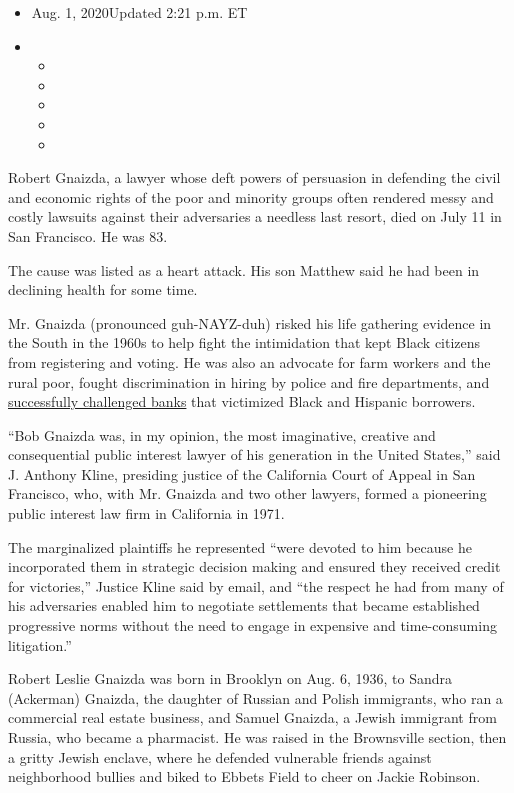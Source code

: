 \begin{itemize}
\item
  Aug. 1, 2020Updated 2:21 p.m. ET
\item
  \begin{itemize}
  \item
  \item
  \item
  \item
  \item
  \end{itemize}
\end{itemize}

Robert Gnaizda, a lawyer whose deft powers of persuasion in defending
the civil and economic rights of the poor and minority groups often
rendered messy and costly lawsuits against their adversaries a needless
last resort, died on July 11 in San Francisco. He was 83.

The cause was listed as a heart attack. His son Matthew said he had been
in declining health for some time.

Mr. Gnaizda (pronounced guh-NAYZ-duh) risked his life gathering evidence
in the South in the 1960s to help fight the intimidation that kept Black
citizens from registering and voting. He was also an advocate for farm
workers and the rural poor, fought discrimination in hiring by police
and fire departments, and
\href{https://www.nytimes3xbfgragh.onion/2011/04/14/business/14prosecute.html}{successfully
challenged banks} that victimized Black and Hispanic borrowers.

``Bob Gnaizda was, in my opinion, the most imaginative, creative and
consequential public interest lawyer of his generation in the United
States,'' said J. Anthony Kline, presiding justice of the California
Court of Appeal in San Francisco, who, with Mr. Gnaizda and two other
lawyers, formed a pioneering public interest law firm in California in
1971.

The marginalized plaintiffs he represented ``were devoted to him because
he incorporated them in strategic decision making and ensured they
received credit for victories,'' Justice Kline said by email, and ``the
respect he had from many of his adversaries enabled him to negotiate
settlements that became established progressive norms without the need
to engage in expensive and time-consuming litigation.''

Robert Leslie Gnaizda was born in Brooklyn on Aug. 6, 1936, to Sandra
(Ackerman) Gnaizda, the daughter of Russian and Polish immigrants, who
ran a commercial real estate business, and Samuel Gnaizda, a Jewish
immigrant from Russia, who became a pharmacist. He was raised in the
Brownsville section, then a gritty Jewish enclave, where he defended
vulnerable friends against neighborhood bullies and biked to Ebbets
Field to cheer on Jackie Robinson.

